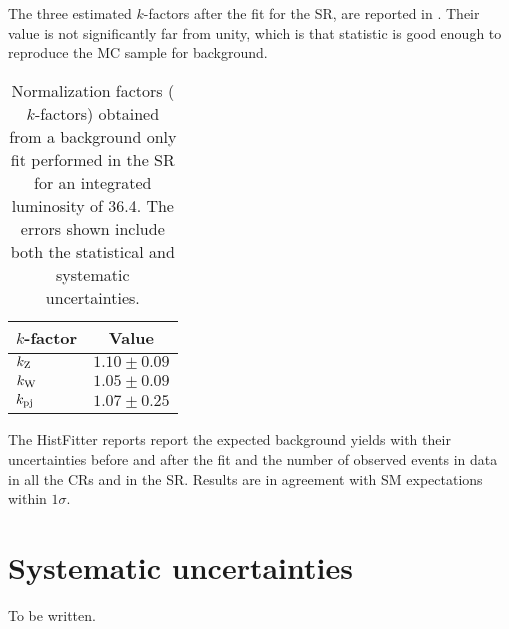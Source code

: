 The three estimated $k$-factors after the fit for the SR, are reported in \Tab{\ref{tab:kfactors}}. Their value is not significantly far from unity, which is that statistic is good enough to reproduce the MC sample for background.

\begin{table}[pt]
\centering
\begin{tabular}{lc}
\toprule
$k$-factor&Value\\
\midrule
$k_{\textup{Z}}$& $1.10\pm0.09$\\
$k_{\textup{W}}$& $1.05\pm0.09$\\
$k_{\textup{pj}}$& $1.07\pm0.25$\\
\bottomrule
\end{tabular}
\caption{Normalization factors ($k$-factors) obtained from a background only fit performed in the SR for an integrated luminosity of \SI{36.4}{\ifb}. The errors shown include both the statistical and systematic uncertainties.}
\label{tab:kfactors}
\end{table}

The HistFitter \Tab{\ref{table.results.systematics.in.logL.fit.table.results.yields}} reports report the expected background yields with their uncertainties before and after the fit and the number of observed events in data in all the CRs and in the SR. Results are in agreement with SM expectations within $1\sigma$.



\section{Systematic uncertainties}
To be written.





